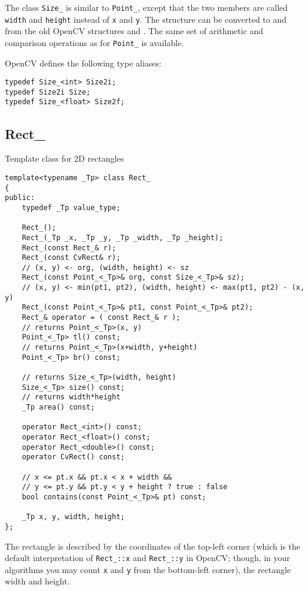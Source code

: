 The class \texttt{Size\_} is similar to \texttt{Point\_}, except that the two members are called \texttt{width} and \texttt{height} instead of \texttt{x} and \texttt{y}. The structure can be converted to and from the old OpenCV structures  and . The same set of arithmetic and comparison operations as for \texttt{Point\_} is available. 

OpenCV defines the following type aliases:

\begin{lstlisting}
typedef Size_<int> Size2i;
typedef Size2i Size;
typedef Size_<float> Size2f;
\end{lstlisting}

\subsection{Rect\_}

Template class for 2D rectangles

\begin{lstlisting}
template<typename _Tp> class Rect_
{
public:
    typedef _Tp value_type;
    
    Rect_();
    Rect_(_Tp _x, _Tp _y, _Tp _width, _Tp _height);
    Rect_(const Rect_& r);
    Rect_(const CvRect& r);
    // (x, y) <- org, (width, height) <- sz
    Rect_(const Point_<_Tp>& org, const Size_<_Tp>& sz);
    // (x, y) <- min(pt1, pt2), (width, height) <- max(pt1, pt2) - (x, y)
    Rect_(const Point_<_Tp>& pt1, const Point_<_Tp>& pt2);
    Rect_& operator = ( const Rect_& r );
    // returns Point_<_Tp>(x, y)
    Point_<_Tp> tl() const;
    // returns Point_<_Tp>(x+width, y+height)
    Point_<_Tp> br() const;
    
    // returns Size_<_Tp>(width, height)
    Size_<_Tp> size() const;
    // returns width*height
    _Tp area() const;

    operator Rect_<int>() const;
    operator Rect_<float>() const;
    operator Rect_<double>() const;
    operator CvRect() const;

    // x <= pt.x && pt.x < x + width &&
    // y <= pt.y && pt.y < y + height ? true : false
    bool contains(const Point_<_Tp>& pt) const;

    _Tp x, y, width, height;
};
\end{lstlisting}

The rectangle is described by the coordinates of the top-left corner (which is the default interpretation of \texttt{Rect\_::x} and \texttt{Rect\_::y} in OpenCV; though, in your algorithms you may count \texttt{x} and \texttt{y} from the bottom-left corner), the rectangle width and height.

